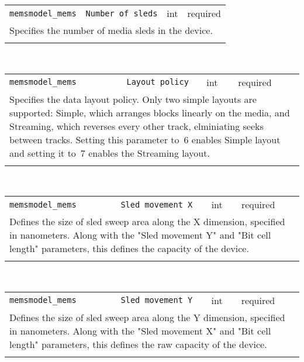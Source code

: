 \noindent 
\begin{tabular}{|p{\lpmodwidth}|p{\lpnamewidth}|p{0.5in}|p{0.5in}|}
\cline{1-4}
\texttt{memsmodel\_mems} & \texttt{Number of sleds} & int & required \\ 
\cline{1-4}
\multicolumn{4}{|p{6in}|}{
Specifies the number of media sleds in the device.
}\\ 
\cline{1-4}
\multicolumn{4}{p{5in}}{}\\
\end{tabular}\\ 
\noindent 
\begin{tabular}{|p{\lpmodwidth}|p{\lpnamewidth}|p{0.5in}|p{0.5in}|}
\cline{1-4}
\texttt{memsmodel\_mems} & \texttt{Layout policy} & int & required \\ 
\cline{1-4}
\multicolumn{4}{|p{6in}|}{
Specifies the data layout policy. Only two simple layouts are
supported: Simple, which arranges blocks linearly on the media, and
Streaming, which reverses every other track, elminiating seeks between
tracks. Setting this parameter to~6 enables Simple layout and setting
it to~7 enables the Streaming layout.
}\\ 
\cline{1-4}
\multicolumn{4}{p{5in}}{}\\
\end{tabular}\\ 
\noindent 
\begin{tabular}{|p{\lpmodwidth}|p{\lpnamewidth}|p{0.5in}|p{0.5in}|}
\cline{1-4}
\texttt{memsmodel\_mems} & \texttt{Sled movement X} & int & required \\ 
\cline{1-4}
\multicolumn{4}{|p{6in}|}{
Defines the size of sled sweep area along the X dimension, specified
in nanometers. Along with the "Sled movement Y" and "Bit cell length"
parameters, this defines the capacity of the device.
}\\ 
\cline{1-4}
\multicolumn{4}{p{5in}}{}\\
\end{tabular}\\ 
\noindent 
\begin{tabular}{|p{\lpmodwidth}|p{\lpnamewidth}|p{0.5in}|p{0.5in}|}
\cline{1-4}
\texttt{memsmodel\_mems} & \texttt{Sled movement Y} & int & required \\ 
\cline{1-4}
\multicolumn{4}{|p{6in}|}{
Defines the size of sled sweep area along the Y dimension, specified
in nanometers. Along with the "Sled movement X" and "Bit cell length"
parameters, this defines the raw capacity of the device.
}\\ 
\cline{1-4}
\multicolumn{4}{p{5in}}{}\\
\end{tabular}\\ 
